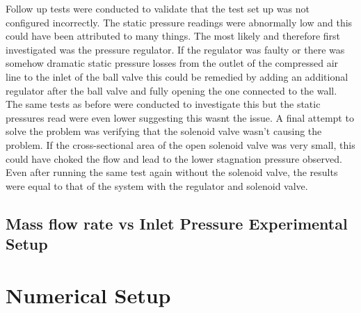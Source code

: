 Follow up tests were conducted to validate that the test set up was not configured incorrectly. The static pressure readings were abnormally low and this could have been attributed to many things. The most likely and therefore first investigated was the pressure regulator. If the regulator was faulty or there was somehow dramatic static pressure losses from the outlet of the compressed air line to the inlet of the ball valve this could be remedied by adding an additional regulator after the ball valve and fully opening the one connected to the wall.
The same tests as before were conducted to investigate this but the static pressures read were even lower suggesting this wasnt the issue.
A final attempt to solve the problem was verifying that the solenoid valve wasn't causing the problem. If the cross-sectional area of the open solenoid valve was very small, this could have choked the flow and lead to the lower stagnation pressure observed. Even after running the same test again without the solenoid valve, the results were equal to that of the system with the regulator and solenoid valve.

\subsection{Mass flow rate vs Inlet Pressure Experimental Setup}

\newpage
\section{Numerical Setup}\label{sec:numerical-setup}
